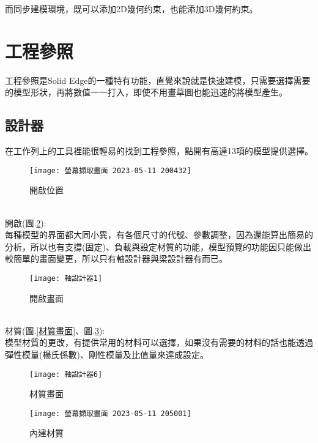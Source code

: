 \qquad 而同步建模環境，既可以添加2D幾何约束，也能添加3D幾何約束。\\

\newpage


\section{工程參照}

工程參照是Solid Edge的一種特有功能，直覺來說就是快速建模，只需要選擇需要的模型形狀，再將數值一一打入，即使不用畫草圖也能迅速的將模型產生。\\

\subsection{設計器}

在工作列上的工具裡能很輕易的找到工程參照，點開有高達13項的模型提供選擇。\\
\begin{figure}[hbt!]
\begin{center}
\texttt{[image: 螢幕擷取畫面 2023-05-11 200432]}
\caption{\Large 開啟位置}\label{開啟位置}
\end{center}
\end{figure}
\\
開啟(圖.\ref{開啟畫面}):\\

每種模型的界面都大同小異，有各個尺寸的代號、參數調整，因為還能算出簡易的分析，所以也有支撐(固定)、負載與設定材質的功能，模型預覽的功能因只能做出較簡單的畫面變更，所以只有軸設計器與梁設計器有而已。\\
\begin{figure}[hbt!]
\begin{center}
\texttt{[image: 軸設計器1]}
\caption{\Large 開啟畫面}\label{開啟畫面}
\end{center}
\end{figure}
\\
材質(圖.\ref{材質畫面}、圖.\ref{內建材質}):\\

模型材質的更改，有提供常用的材料可以選擇，如果沒有需要的材料的話也能透過彈性模量(楊氏係數)、剛性模量及比值量來達成設定。\\
\begin{figure}[hbt!]
\begin{center}
\texttt{[image: 軸設計器6]}
\caption{\Large 材質畫面}\label{材質畫面}
\texttt{[image: 螢幕擷取畫面 2023-05-11 205001]}
\caption{\Large 內建材質}\label{內建材質}
\end{center}
\end{figure}
\\

